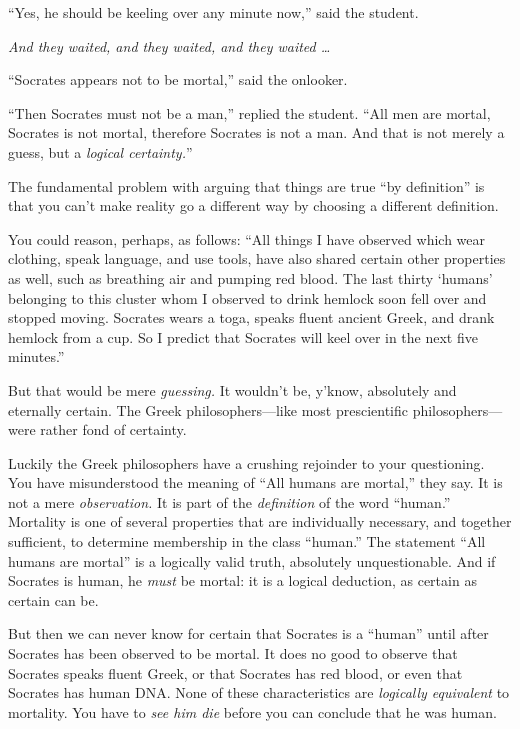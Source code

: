 {
 ``Yes, he should be keeling over any minute
now,'' said the student.}

{
 \textit{And they waited, and they waited, and they waited \ldots}}

{
 ``Socrates appears not to be
mortal,'' said the onlooker.}

{
 ``Then Socrates must not be a
man,'' replied the student. ``All
men are mortal, Socrates is not mortal, therefore Socrates is not a
man. And that is not merely a guess, but a \textit{logical
certainty.}''}

{
 The fundamental problem with arguing that things are true
``by definition'' is that you
can't make reality go a different way by choosing a
different definition.}

{
 You could reason, perhaps, as follows: ``All
things I have observed which wear clothing, speak language, and use
tools, have also shared certain other properties as well, such as
breathing air and pumping red blood. The last thirty
`humans' belonging to this cluster whom
I observed to drink hemlock soon fell over and stopped moving. Socrates
wears a toga, speaks fluent ancient Greek, and drank hemlock from a
cup. So I predict that Socrates will keel over in the next five
minutes.''}

{
 But that would be mere \textit{guessing.} It
wouldn't be, y'know, absolutely and
eternally certain. The Greek philosophers---like most prescientific
philosophers---were rather fond of certainty.}

{
 Luckily the Greek philosophers have a crushing rejoinder to your
questioning. You have misunderstood the meaning of
``All humans are mortal,'' they say.
It is not a mere \textit{observation.} It is part of the
\textit{definition} of the word
``human.'' Mortality is one of
several properties that are individually necessary, and together
sufficient, to determine membership in the class
``human.'' The statement
``All humans are mortal'' is a
logically valid truth, absolutely unquestionable. And if Socrates is
human, he \textit{must} be mortal: it is a logical deduction, as
certain as certain can be.}

{
 But then we can never know for certain that Socrates is a
``human'' until after Socrates has
been observed to be mortal. It does no good to observe that Socrates
speaks fluent Greek, or that Socrates has red blood, or even that
Socrates has human DNA. None of these characteristics are
\textit{logically equivalent} to mortality. You have to \textit{see him
die} before you can conclude that he was human.}

